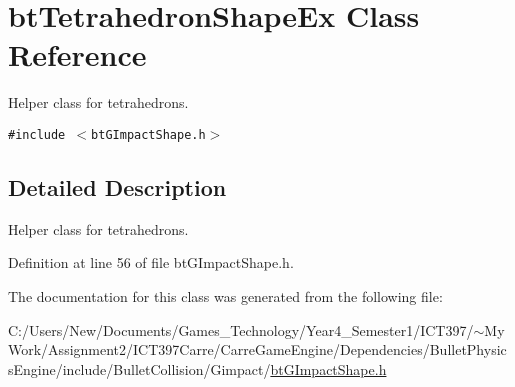 \hypertarget{classbt_tetrahedron_shape_ex}{
\section{btTetrahedronShapeEx Class Reference}
\label{classbt_tetrahedron_shape_ex}
}
Helper class for tetrahedrons.  


{\tt \#include $<$btGImpactShape.h$>$}



\subsection{Detailed Description}
Helper class for tetrahedrons. 

Definition at line 56 of file btGImpactShape.h.

The documentation for this class was generated from the following file:\begin{CompactItemize}
\item 
C:/Users/New/Documents/Games\_\-Technology/Year4\_\-Semester1/ICT397/$\sim$My Work/Assignment2/ICT397Carre/CarreGameEngine/Dependencies/BulletPhysicsEngine/include/BulletCollision/Gimpact/\hyperlink{bt_g_impact_shape_8h}{btGImpactShape.h}\end{CompactItemize}
